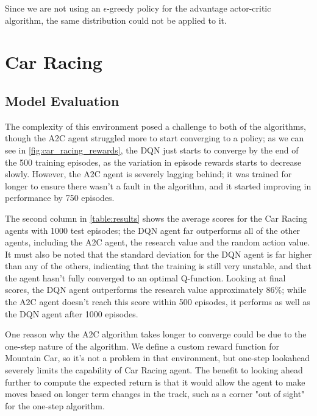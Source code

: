 

Since we are not using an $\epsilon$-greedy policy for the advantage
actor-critic algorithm, the same distribution could not be applied to it.

\section{Car Racing}

\subsection{Model Evaluation}

The complexity of this environment posed a challenge to both of the algorithms,
though the A2C agent struggled more to start converging to a policy; as we can
see in \autoref{fig:car_racing_rewards}, the DQN just starts to converge by the
end of the 500 training episodes, as the variation in episode rewards starts to
decrease slowly. However, the A2C agent is severely lagging behind; it was
trained for longer to ensure there wasn't a fault in the algorithm, and it
started improving in performance by 750 episodes.



The second column in \autoref{table:results} shows the average scores for the
Car Racing agents with 1000 test episodes; the DQN agent far outperforms all of
the other agents, including the A2C agent, the research value and the random
action value. It must also be noted that the standard deviation for the DQN
agent is far higher than any of the others, indicating that the training is
still very unstable, and that the agent hasn't fully converged to an optimal
Q-function. Looking at final scores, the DQN agent outperforms the research
value approximately 86\%; while the A2C agent doesn't reach this score within
500 episodes, it performs as well as the DQN agent after 1000 episodes.

One reason why the A2C algorithm takes longer to converge could be due to the
one-step nature of the algorithm. We define a custom reward function for
Mountain Car, so it's not a problem in that environment, but one-step lookahead
severely limits the capability of Car Racing agent. The benefit to looking
ahead further to compute the expected return is that it would allow the agent
to make moves based on longer term changes in the track, such as a corner "out
of sight" for the one-step algorithm.

